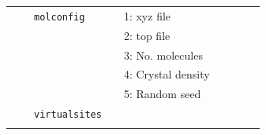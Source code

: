 \documentclass[11pt]{article}
\begin{document}
\begin{center}
\begin{tabular}{cclclcccc}
    $\mbox{}$ && \verb!molconfig!&& 1: \textsf{xyz} file && \\
              &&                 && 2: \textsf{top} file && \\
              &&                 && 3: No. molecules && \\
              &&                 && 4: Crystal density && \\
              &&                 && 5: Random seed && \\
              &&\verb!virtualsites!&& && \\ 
    && && && \\
    \hline                                           
  \end{tabular}

\end{center}
\end{document}
